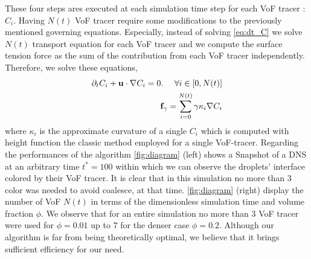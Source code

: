 These four steps ares executed at each simulation time step for each VoF tracer : $C_i$. 
Having $N(t)$ VoF tracer require some modifications to the previously mentioned governing equations. 
Especially, instead of solving \ref{eq:dt_C}  we solve $N(t)$ transport equation for each VoF tracer and we compute the surface tension force as the sum of the contribution from each VoF tracer independently.
Therefore, we solve these equations, 
\begin{align*}
    \partial_t C_i + \textbf{u}\cdot\mathbf{\nabla} C_i = 0.
    \ \  \ \ \forall i \in [0,N(t)]\\
    \textbf{f}_\gamma 
    = \sum_{i=0}^{N(t)} \gamma \kappa_i \mathbf{\nabla} C_i
\end{align*}
where $\kappa_i$ is the approximate curvature of a single $C_i$ which is computed with height function the classic method employed for a single VoF-tracer. 
Regarding the performances of the algorithm \ref{fig:diagram} (left) shows a Snapshot of a DNS at an arbitrary time $t^* = 100$ within which we can observe the droplets' interface colored by their VoF tracer. 
It is clear that in this simulation no more than 3 color was needed to avoid coalesce, at that time.
\ref{fig:diagram} (right) display the number of VoF $N(t)$ in terms of the dimensionless simulation time and volume fraction $\phi$. 
We observe that for an entire simulation no more than 3 VoF tracer were used for $\phi = 0.01$ up to $7$ for the denser case $\phi = 0.2$. 
Although our algorithm is far from being theoretically optimal, we believe that it brings sufficient efficiency for our need. 
